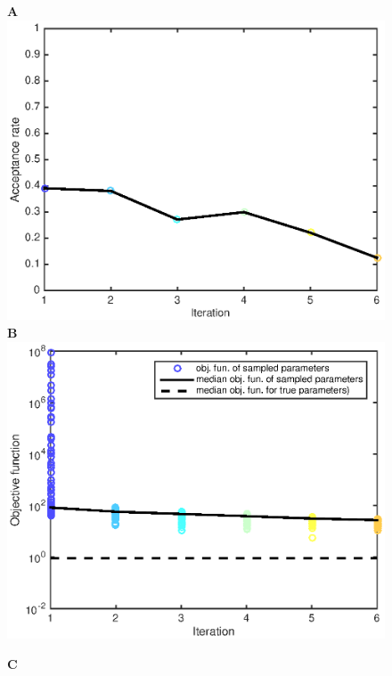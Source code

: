 \documentclass[10pt,letterpaper]{article}
\begin{document}
\begin{figure}[htbp]
\begin{minipage}[t]{0.33\textwidth}
\textbf{A}
\includegraphics[width=\textwidth]{Figures/FitToyData2a}\\
\textbf{B}
\includegraphics[width=\textwidth]{Figures/FitToyData2b}
\end{minipage}
\begin{minipage}[t]{0.66\textwidth}
\textbf{C}\\

\end{minipage}
\end{figure}
\end{document}
